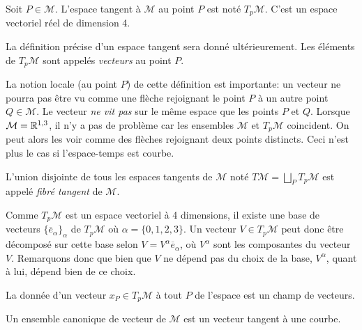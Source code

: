\begin{theoremframe}
    \begin{notat}
    Soit $P\in \mathcal{M}$. L'espace tangent à $\mathcal{M}$ au point $P$ est noté $T_p\mathcal{M}$. C'est un espace vectoriel réel de dimension 4.
    \end{notat}
\end{theoremframe}
La définition précise d'un espace tangent sera donné ultérieurement. Les éléments de $T_p\mathcal{M}$ sont appelés \textit{vecteurs} au point $P$. 
\begin{rmk}
La notion locale (au point $P$) de cette définition est importante: un vecteur ne pourra pas être vu comme une flèche rejoignant le point $P$ à un autre point $Q \in \mathcal{M}$. Le vecteur \textit{ne vit pas} sur le même espace que les points $P$ et $Q$. Lorsque $\mathcal{M} = \mathbb{R}^{1,3}$, il n'y a pas de problème car les ensembles $\mathcal{M}$ et $T_p\mathcal{M}$ coincident. On peut alors les voir comme des flèches rejoignant deux points distincts. Ceci n'est plus le cas si l'espace-temps est courbe.
\end{rmk}
\begin{theoremframe}
\begin{defi}
    L'union disjointe de tous les espaces tangents de $\mathcal{M}$ noté $T\mathcal{M}=\bigsqcup_P T_p\mathcal{M}$ est appelé \textit{fibré tangent} de $\mathcal{M}$.
\end{defi}
\end{theoremframe}
Comme $T_p\mathcal{M}$ est un espace vectoriel à 4 dimensions, il existe une base de vecteurs $\{\overline{e}_\alpha\}_\alpha$ de $T_p\mathcal{M}$ où $\alpha = \{0,1,2,3\}$. Un vecteur $V \in T_p\mathcal{M}$ peut donc être décomposé sur cette base selon $V = V^\alpha \overline{e}_\alpha$, où $V^\alpha$ sont les composantes du vecteur $V$. Remarquons donc que bien que $V$ ne dépend pas du choix de la base, $V^\alpha$, quant à lui, dépend bien de ce choix.

La donnée d'un vecteur $x_{P} \in T_{p}\mathcal{M}$ à tout $P$ de l'espace est un champ de vecteurs.

Un ensemble canonique de vecteur de $\mathcal{M}$ est un vecteur tangent à une courbe. 

